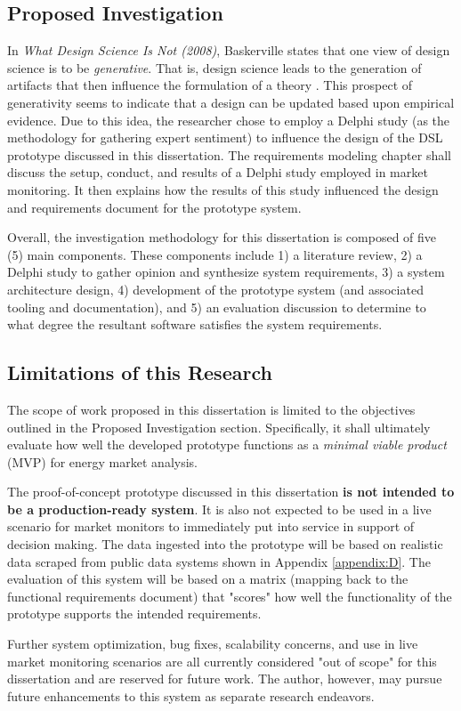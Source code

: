 \subsection{Proposed Investigation}

In \textit{What Design Science Is Not (2008)}, Baskerville states that one view of design science is to be \textit{generative}. That is, design science leads to the generation of artifacts that then influence the formulation of a theory \cite{design-science-is-not}. This prospect of generativity seems to indicate that a design can be updated based upon empirical evidence. Due to this idea, the researcher chose to employ a Delphi study (as the methodology for gathering expert sentiment) to influence the design of the DSL prototype discussed in this dissertation. The requirements modeling chapter shall discuss the setup, conduct, and results of a Delphi study employed in market monitoring. It then explains how the results of this study influenced the design and requirements document for the prototype system.

Overall, the investigation methodology for this dissertation is composed of five (5) main components. These components include 1) a literature review, 2) a Delphi study to gather opinion and synthesize system requirements, 3) a system architecture design, 4) development of the prototype system (and associated tooling and documentation), and 5) an evaluation discussion to determine to what degree the resultant software satisfies the system requirements.

\subsection{Limitations of this Research}

The scope of work proposed in this dissertation is limited to the objectives outlined in the Proposed Investigation section. Specifically, it shall ultimately evaluate how well the developed prototype functions as a \textit{minimal viable product} (MVP) for energy market analysis.

The proof-of-concept prototype discussed in this dissertation \textbf{is not intended to be a production-ready system}. It is also not expected to be used in a live scenario for market monitors to immediately put into service in support of decision making. The data ingested into the prototype will be based on realistic data scraped from public data systems shown in Appendix \ref{appendix:D}. The evaluation of this system will be based on a matrix (mapping back to the functional requirements document) that "scores" how well the functionality of the prototype supports the intended requirements.

Further system optimization, bug fixes, scalability concerns, and use in live market monitoring scenarios are all currently considered "out of scope" for this dissertation and are reserved for future work. The author, however, may pursue future enhancements to this system as separate research endeavors.
